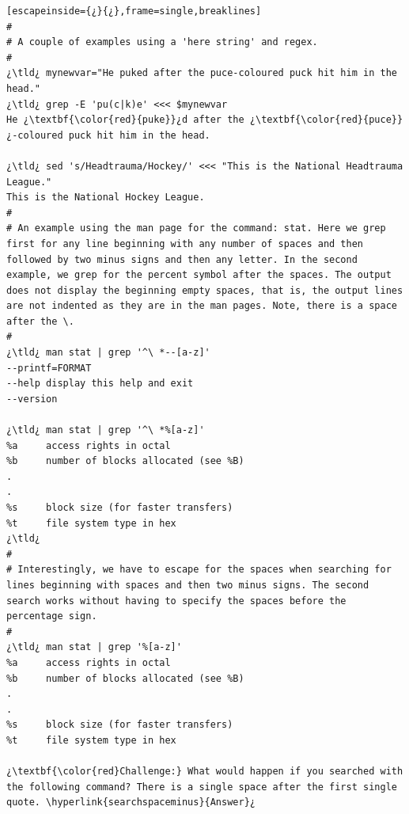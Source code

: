 \begin{lstlisting}[escapeinside={¿}{¿},frame=single,breaklines]
#
# A couple of examples using a 'here string' and regex.
#
¿\tld¿ mynewvar="He puked after the puce-coloured puck hit him in the head."
¿\tld¿ grep -E 'pu(c|k)e' <<< $mynewvar
He ¿\textbf{\color{red}{puke}}¿d after the ¿\textbf{\color{red}{puce}}¿-coloured puck hit him in the head.

¿\tld¿ sed 's/Headtrauma/Hockey/' <<< "This is the National Headtrauma League."
This is the National Hockey League.
#
# An example using the man page for the command: stat. Here we grep first for any line beginning with any number of spaces and then followed by two minus signs and then any letter. In the second example, we grep for the percent symbol after the spaces. The output does not display the beginning empty spaces, that is, the output lines are not indented as they are in the man pages. Note, there is a space after the \.
#
¿\tld¿ man stat | grep '^\ *--[a-z]'
--printf=FORMAT
--help display this help and exit
--version

¿\tld¿ man stat | grep '^\ *%[a-z]'
%a     access rights in octal
%b     number of blocks allocated (see %B)
.
.
%s     block size (for faster transfers)
%t     file system type in hex
¿\tld¿ 
#
# Interestingly, we have to escape for the spaces when searching for lines beginning with spaces and then two minus signs. The second search works without having to specify the spaces before the percentage sign.
#
¿\tld¿ man stat | grep '%[a-z]'
%a     access rights in octal
%b     number of blocks allocated (see %B)
.
.
%s     block size (for faster transfers)
%t     file system type in hex

¿\textbf{\color{red}Challenge:} What would happen if you searched with the following command? There is a single space after the first single quote. \hyperlink{searchspaceminus}{Answer}¿
	

\end{lstlisting}
